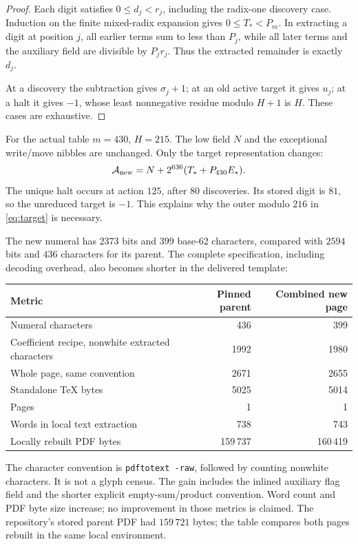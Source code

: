 \documentclass[11pt,letterpaper]{article}
\theoremstyle{definition}
\newcommand{\code}[1]{\texttt{\small #1}}
\begin{document}
\begin{proof}
Each digit satisfies \(0\le d_j<r_j\), including the radix-one discovery
case. Induction on the finite mixed-radix expansion gives
\(0\le T_*<P_m\). In extracting a digit at position \(j\), all earlier
terms sum to less than \(P_j\), while all later terms and the auxiliary
field are divisible by \(P_jr_j\). Thus the extracted remainder is
exactly \(d_j\).

At a discovery the subtraction gives \(\sigma_j+1\); at an old active
target it gives \(u_j\); at a halt it gives \(-1\), whose least
nonnegative residue modulo \(H+1\) is \(H\). These cases are exhaustive.
\end{proof}

For the actual table \(m=430\), \(H=215\). The low field \(N\) and the
exceptional write/move nibbles are unchanged. Only the target
representation changes:
\[
 \mathcal A_{\rm new}=N+2^{636}(T_*+P_{430}E_*).
\]
The unique halt occurs at action \(125\), after \(80\) discoveries.
Its stored digit is \(81\), so the unreduced target is \(-1\).
This explains why the outer modulo \(216\) in \eqref{eq:target} is
necessary.

The new numeral has \(2373\) bits and \(399\) base-62 characters, compared
with \(2594\) bits and \(436\) characters for its parent. The complete
specification, including decoding overhead, also becomes shorter in
the delivered template:
\begin{center}
\small
\begin{tabular}{lrr}
\toprule
Metric & Pinned parent & Combined new page\\
\midrule
Numeral characters &436&399\\
Coefficient recipe, nonwhite extracted characters &1992&1980\\
Whole page, same convention &2671&2655\\
Standalone TeX bytes &5025&5014\\
Pages &1&1\\
Words in local text extraction &738&743\\
Locally rebuilt PDF bytes &159\,737&160\,419\\
\bottomrule
\end{tabular}
\end{center}
The character convention is \code{pdftotext -raw}, followed by counting
nonwhite characters. It is not a glyph census. The gain includes the
inlined auxiliary flag field and the shorter explicit empty-sum/product
convention. Word count and PDF byte size increase; no improvement in
those metrics is claimed. The repository's stored parent PDF had
\(159\,721\) bytes; the table compares both pages rebuilt in the same
local environment.
\end{document}
